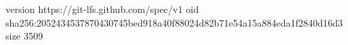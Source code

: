 version https://git-lfs.github.com/spec/v1
oid sha256:2052434537870430745bed918a40f88024d82b71e54a15a884eda1f2840d16d3
size 3509
